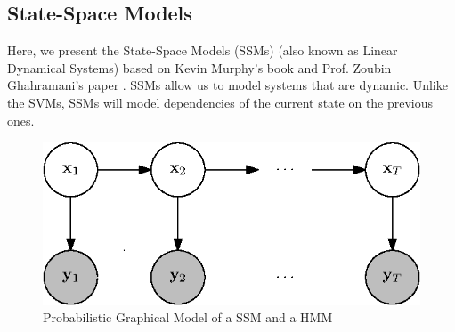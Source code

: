 \subsection{State-Space Models}
	Here, we present the State-Space Models (SSMs) (also known as Linear Dynamical Systems) based on Kevin Murphy's book \cite[Chapter 18]{mlBook} and Prof. Zoubin Ghahramani's paper \cite{ghahramani2000variational}. SSMs allow us to model systems that are dynamic. Unlike the SVMs, SSMs will model dependencies of the current state on the previous ones.
	\begin{figure}[h!]
		\centering
			\includegraphics{drawings/pgm.eps}
		\caption{Probabilistic Graphical Model of a SSM and a HMM}
		\label{fig:pgm}
	\end{figure}
	
